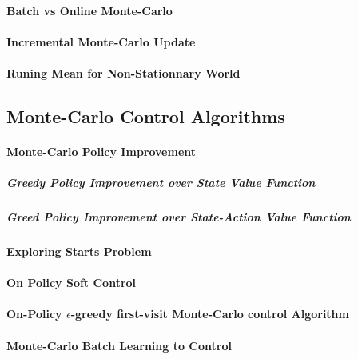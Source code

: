 
		\paragraph*{Batch vs Online Monte-Carlo}

		\paragraph*{Incremental Monte-Carlo Update}

		\paragraph*{Runing Mean for Non-Stationnary World}

	\subsection{Monte-Carlo Control Algorithms} %
		\label{sub:monte_carlo_control_algorithms}
	
		\paragraph*{Monte-Carlo Policy Improvement}

			\subparagraph*{Greedy Policy Improvement over State Value Function}

			\subparagraph*{Greed Policy Improvement over State-Action Value Function}

		\paragraph*{Exploring Starts Problem}

		\paragraph*{On Policy Soft Control}
		
		\paragraph*{On-Policy $\epsilon$-greedy first-visit Monte-Carlo control Algorithm}

		\paragraph*{Monte-Carlo Batch Learning to Control}

